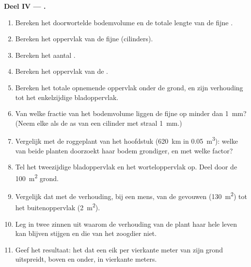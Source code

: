 \begin{problem}
\medskip
\noindent\textbf{Deel IV --- .}
\begin{enumerate}[resume]
  \item Bereken het doorwortelde bodemvolume en de totale lengte van de
        fijne .
  \item Bereken het oppervlak van de fijne  (cilinders).
  \item Bereken het aantal .
  \item Bereken het oppervlak van de .
  \item Bereken het totale opnemende oppervlak onder de grond, en zijn
        verhouding tot het enkelzijdige bladoppervlak.
  \item Van welke fractie van het bodemvolume liggen de fijne  op
        minder dan \qty{1}{mm}? (Neem elke  als de as van een
        cilinder met straal \qty{1}{mm}.)
  \item Vergelijk met de roggeplant van het hoofdstuk (\qty{620}{km}
         in \qty{0.05}{m^3}): welke van beide planten doorzoekt haar
        bodem grondiger, en met welke factor?
  \item Tel het tweezijdige bladoppervlak en het worteloppervlak op. Deel
        door de \qty{100}{m^2} grond.
  \item Vergelijk dat met de verhouding, bij een mens, van de gevouwen
         (\qty{130}{m^2}) tot het
        buitenoppervlak (\qty{2}{m^2}).
  \item Leg in twee zinnen uit waarom de verhouding van de plant haar hele
        leven kan blijven stijgen en die van het zoogdier niet.
  \item Geef het resultaat: het  dat een eik per
        vierkante meter van zijn grond uitspreidt, boven en onder, in
        vierkante meters.
\end{enumerate}
\end{problem}
